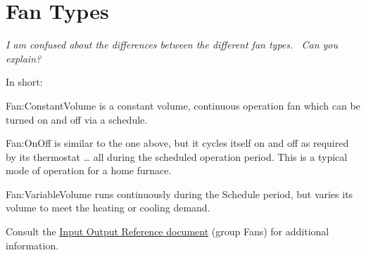 \section{Fan Types}\label{fan-types}

\emph{I am confused about the differences between the different fan types.~ Can you explain?}

In short:

Fan:ConstantVolume is a constant volume, continuous operation fan which can be turned on and off via a schedule.

Fan:OnOff is similar to the one above, but it cycles itself on and off as required by its thermostat \ldots{} all during the scheduled operation period. This is a typical mode of operation for a home furnace.

Fan:VariableVolume runs continuously during the Schedule period, but varies its volume to meet the heating or cooling demand.

Consult the \href{file:///E:/Docs4PDFs/InputOutputReference.pdf}{Input Output Reference document} (group Fans) for additional information.
